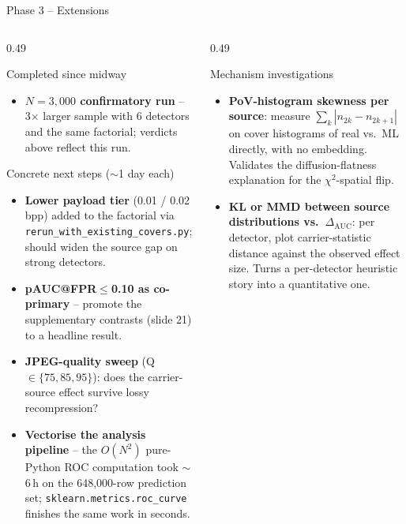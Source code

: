 \documentclass[aspectratio=169,11pt]{beamer}
\begin{document}
\begin{frame}{Phase 3 -- Extensions}
\scriptsize
\begin{columns}[T]
\begin{column}{0.49\textwidth}
\begin{block}{Completed since midway}
\begin{itemize}\setlength{\itemsep}{1pt}
\item \textbf{$N\!=\!3{,}000$ confirmatory run} -- 3$\times$ larger sample with 6 detectors and the same factorial; verdicts above reflect this run.
\end{itemize}
\end{block}
\begin{block}{Concrete next steps ($\sim$1 day each)}
\begin{itemize}\setlength{\itemsep}{1pt}
\item \textbf{Lower payload tier} (0.01 / 0.02 bpp) added to the factorial via \texttt{rerun\_with\_existing\_covers.py}; should widen the source gap on strong detectors.
\item \textbf{pAUC@FPR$\leq$0.10 as co-primary} -- promote the supplementary contrasts (slide 21) to a headline result.
\item \textbf{JPEG-quality sweep} (Q$\in\{75,85,95\}$): does the carrier-source effect survive lossy recompression?
\item \textbf{Vectorise the analysis pipeline} -- the $O(N^2)$ pure-Python ROC computation took $\sim$6\,h on the 648{,}000-row prediction set; \texttt{sklearn.metrics.roc\_curve} finishes the same work in seconds.
\end{itemize}
\end{block}
\end{column}
\begin{column}{0.49\textwidth}
\begin{block}{Mechanism investigations}
\begin{itemize}\setlength{\itemsep}{1pt}
\item \textbf{PoV-histogram skewness per source}: measure $\sum_k|n_{2k}-n_{2k+1}|$ on cover histograms of real vs.\ ML directly, with no embedding. Validates the diffusion-flatness explanation for the $\chi^2$-spatial flip.
\item \textbf{KL or MMD between source distributions vs.\ $\Delta_\text{AUC}$}: per detector, plot carrier-statistic distance against the observed effect size. Turns a per-detector heuristic story into a quantitative one.

\end{itemize}
\end{block}
\end{column}
\end{columns}
\end{frame}
\end{document}
